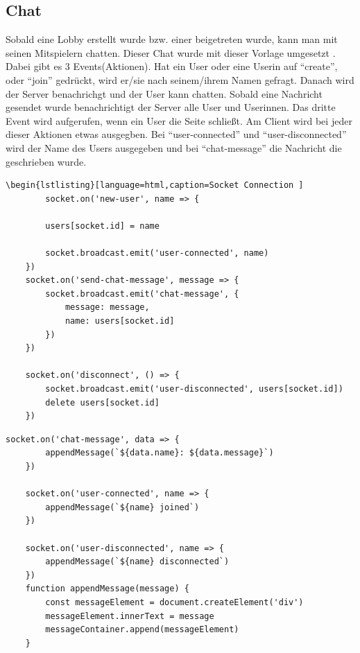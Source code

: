 \subsection{Chat}
Sobald eine Lobby erstellt wurde bzw. einer beigetreten wurde, kann man mit seinen Mitspielern chatten. 
Dieser Chat wurde mit dieser Vorlage umgesetzt \cite{chat}. 
Dabei gibt es 3 Events(Aktionen). Hat ein User oder eine Userin auf ``create'', oder ``join'' gedrückt, wird er/sie nach seinem/ihrem Namen gefragt.
Danach wird der Server benachrichgt und der User kann chatten. Sobald eine Nachricht gesendet wurde benachrichtigt der Server alle 
User und Userinnen. Das dritte Event wird aufgerufen, wenn ein User die Seite schließt. Am Client wird 
bei jeder dieser Aktionen etwas ausgegben. Bei ``user-connected'' und ``user-disconnected'' wird der Name des Users ausgegeben und bei ``chat-message'' die Nachricht die geschrieben wurde. 
\begin{lstlisting}[language=html,caption=Chat Server ]
    \begin{lstlisting}[language=html,caption=Socket Connection ]
        socket.on('new-user', name => {

        users[socket.id] = name

        socket.broadcast.emit('user-connected', name)
    })
    socket.on('send-chat-message', message => {
        socket.broadcast.emit('chat-message', {
            message: message,
            name: users[socket.id]
        })
    })

    socket.on('disconnect', () => {
        socket.broadcast.emit('user-disconnected', users[socket.id])
        delete users[socket.id]
    })
\end{lstlisting}

\begin{lstlisting}[language=html,caption=Chat Frontend]
    socket.on('chat-message', data => {
        appendMessage(`${data.name}: ${data.message}`)
    })

    socket.on('user-connected', name => {
        appendMessage(`${name} joined`)
    })

    socket.on('user-disconnected', name => {
        appendMessage(`${name} disconnected`)
    })
    function appendMessage(message) {
        const messageElement = document.createElement('div')
        messageElement.innerText = message
        messageContainer.append(messageElement)
    }
\end{lstlisting}

